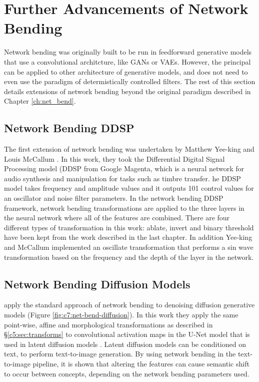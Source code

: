 \section{Further Advancements of Network Bending}

Network bending was originally built to be run in feedforward generative models that use a convolutional architcture, like GANs or VAEs. 
However, the principal can be applied to other architecture of generative models, and does not need to even use the paradigm of determistically controlled filters. 
The rest of this section details extensions of network bending beyond the original paradigm described in Chapter \ref{ch:net_bend}.

\subsection{Network Bending DDSP}

The first extension of network bending was undertaken by Matthew Yee-king and Louis McCallum \citep{mccallum2020network,yee2021studio}. 
In this work, they took the Differential Digital Signal Processing model (DDSP from Google Magenta, which is a neural network for audio synthesis and manipulation for tasks such as timbre transfer. 
he DDSP model takes frequency and amplitude values and it outputs 101 control values for an oscillator and noise filter parameters. 
In the network bending DDSP framework, network bending transformations are applied to the three layers in the neural network where all of the features are combined. 
There are four different types of transformation in this work: ablate, invert and binary threshold have been kept from the work described in the last chapter.
 In addition Yee-king and McCallum implemented an oscillate transformation that performs a sin wave transformation based on the frequency and the depth of the layer in the network. 

 \subsection{Network Bending Diffusion Models}

 \cite{dzwonczyk2024network} apply the standard approach of network bending to denoising diffusion generative models (Figure \ref{fig:c7:net-bend-diffusion}).
 In this work they apply the same point-wise, affine and morphological transformations as described in \S \ref{c5:sec:transforms} to convolutional activation maps in the U-Net model \citep{ronneberger2015u} that is used in latent diffusion models \citep{rombach2022high}. 
 Latent diffusion models can be conditioned on text, to perform text-to-image generation.
 By using network bending in the text-to-image pipeline, it is shown that altering the features can cause semantic shift to occur between concepts, depending on the network bending parameters used.


